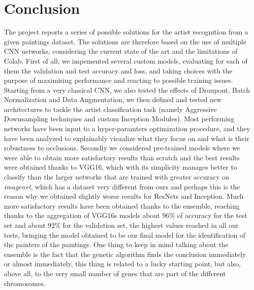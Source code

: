 \section{Conclusion}
The project reports a series of possible solutions for the artist recognition from a given paintings dataset. The solutions are therefore based on the use of multiple CNN networks, considering the current state of the art and the limitations of Colab.
First of all, we impemented several custom models, evaluating for each of them the validation and test accuracy and loss, and taking choices with the purpose of maximising performance and reacting to possible training issues. Starting from a very classical CNN, we also tested the effects of Droupout, Batch Normalization and Data Augmentation, we then defined and tested new architectures to tackle the artist classification task (namely Aggressive Downsampling techniques and custom Inception Modules). Most performing networks have been input to a hyper-paramters optimization procedure, and they have been analyzed to explainably visualize what they focus on and what is their robustness to occlusions.
Secondly we considered pre-trained models where we were able to obtain more satisfactory results than scratch and the best results were obtained thanks to VGG16, which with its simplicity manages better to classify than the larger networks that are trained with greater accuracy on \textit{imagenet}, which has a dataset very different from ours and perhaps this is the reason why we obtained slightly worse results for ResNets and Inception. 
Much more satisfactory results have been obtained thanks to the ensemble, reaching thanks to the aggregation of VGG16s models about 96\% of accuracy for the test set and about 92\% for the validation set, the highest values reached in all our tests, bringing the model obtained to be our final model for the identification of the painters of the paintings. One thing to keep in mind talking about the ensemble is the fact that the genetic algorithm finds the conclusion immediately or almost immediately, this thing is related to a lucky starting point, but also, above all, to the very small number of genes that are part of the different chromosomes.